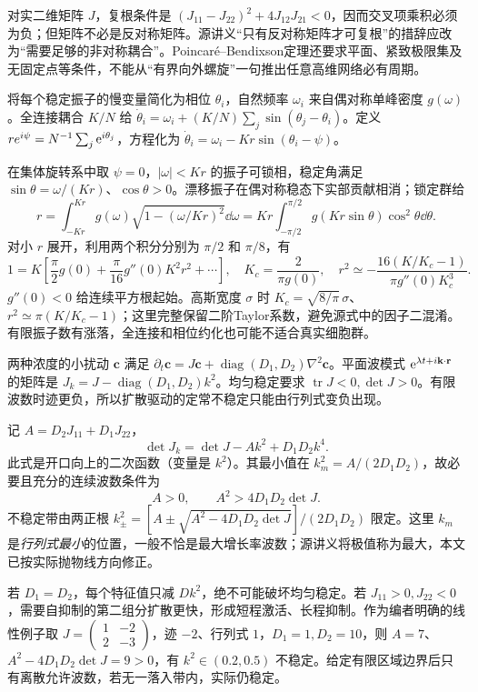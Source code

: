 对实二维矩阵 $J$，复根条件是 $(J_{11}-J_{22})^2+4J_{12}J_{21}<0$，因而交叉项乘积必须为负；但矩阵不必是反对称矩阵。源讲义“只有反对称矩阵才可复根”的措辞应改为“需要足够的非对称耦合”。Poincar\'e--Bendixson定理还要求平面、紧致极限集及无固定点等条件，不能从“有界向外螺旋”一句推出任意高维网络必有周期。

将每个稳定振子的慢变量简化为相位 $\theta_i$，自然频率 $\omega_i$ 来自偶对称单峰密度 $g(\omega)$。全连接耦合 $K/N$ 给 $\dot\theta_i=\omega_i+(K/N)\sum_j\sin(\theta_j-\theta_i)$。定义 $re^{i\psi}=N^{-1}\sum_j\mathrm e^{i\theta_j}$，方程化为 $\dot\theta_i=\omega_i-Kr\sin(\theta_i-\psi)$。

在集体旋转系中取 $\psi=0$，$|\omega|<Kr$ 的振子可锁相，稳定角满足 $\sin\theta=\omega/(Kr)$、$\cos\theta>0$。漂移振子在偶对称稳态下实部贡献相消；锁定群给
\[
r=\int_{-Kr}^{Kr}g(\omega)\sqrt{1-(\omega/Kr)^2}\dd\omega
=Kr\int_{-\pi/2}^{\pi/2}g(Kr\sin\theta)\cos^2\theta\dd\theta.
\]
对小 $r$ 展开，利用两个积分分别为 $\pi/2$ 和 $\pi/8$，有
\[
1=K\left[\frac\pi2g(0)+\frac\pi{16}g''(0)K^2r^2+\cdots\right],\quad
K_c=\frac2{\pi g(0)},\quad
r^2\simeq-\frac{16(K/K_c-1)}{\pi g''(0)K_c^3}.
\]
$g''(0)<0$ 给连续平方根起始。高斯宽度 $\sigma$ 时 $K_c=\sqrt{8/\pi}\,\sigma$、$r^2\simeq\pi(K/K_c-1)$；这里完整保留二阶Taylor系数，避免源式中的因子二混淆。有限振子数有涨落，全连接和相位约化也可能不适合真实细胞群。

两种浓度的小扰动 $\mathbf c$ 满足 $\partial_t\mathbf c=J\mathbf c+\operatorname{diag}(D_1,D_2)\nabla^2\mathbf c$。平面波模式 $\mathrm e^{\lambda t+i\mathbf k\cdot\mathbf r}$ 的矩阵是 $J_k=J-\operatorname{diag}(D_1,D_2)k^2$。均匀稳定要求 $\operatorname{tr}J<0,\det J>0$。有限波数时迹更负，所以扩散驱动的定常不稳定只能由行列式变负出现。

记 $A=D_2J_{11}+D_1J_{22}$，
\[
\det J_k=\det J-Ak^2+D_1D_2k^4.
\]
此式是开口向上的二次函数（变量是 $k^2$）。其最小值在 $k_m^2=A/(2D_1D_2)$，故必要且充分的连续波数条件为
\[
A>0,\qquad A^2>4D_1D_2\det J.
\]
不稳定带由两正根 $k_\pm^2=[A\pm\sqrt{A^2-4D_1D_2\det J}]/(2D_1D_2)$ 限定。这里 $k_m$ 是\emph{行列式最小}的位置，一般不恰是最大增长率波数；源讲义将极值称为最大，本文已按实际抛物线方向修正。

若 $D_1=D_2$，每个特征值只减 $Dk^2$，绝不可能破坏均匀稳定。若 $J_{11}>0,J_{22}<0$，需要自抑制的第二组分扩散更快，形成短程激活、长程抑制。作为编者明确的线性例子取 $J=\begin{pmatrix}1&-2\\2&-3\end{pmatrix}$，迹 $-2$、行列式 $1$，$D_1=1,D_2=10$，则 $A=7$、$A^2-4D_1D_2\det J=9>0$，有 $k^2\in(0.2,0.5)$ 不稳定。给定有限区域边界后只有离散允许波数，若无一落入带内，实际仍稳定。

